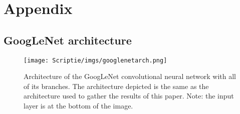 \documentclass{uva-inf-bachelor-thesis}
\begin{document}

\printbibliography

\appendix
\chapter{Appendix}
\newpage
\section{GoogLeNet architecture}
\begin{figure}[H]
\centering
\texttt{[image: Scriptie/imgs/googlenetarch.png]}
\caption{Architecture of the GoogLeNet convolutional neural network with all of its branches. The architecture depicted is the same as the architecture used to gather the results of this paper. Note: the input layer is at the bottom of the image.}
\end{figure}
\end{document}
